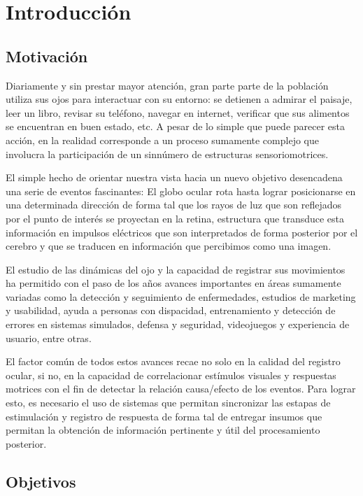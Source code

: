 \documentclass[../main.tex]{subfiles}
\begin{document}
		
\chapter{Introducción}
\label{cha:01_introducción}
	\section{Motivación}
	\label{sec:01_motivacion}

		Diariamente y sin prestar mayor atención, gran parte parte de la población utiliza sus ojos para interactuar con su entorno: se detienen a admirar el paisaje, leer un libro, revisar su teléfono, navegar en internet, verificar que sus alimentos se encuentran en buen estado, etc. A pesar de lo simple que puede parecer esta acción, en la realidad corresponde a un proceso sumamente complejo que involucra la participación de un sinnúmero de estructuras sensoriomotrices. 

		El simple hecho de orientar nuestra vista hacia un nuevo objetivo desencadena una serie de eventos fascinantes: El globo ocular rota hasta lograr posicionarse en una determinada dirección de forma tal que los rayos de luz que son reflejados por el punto de interés se proyectan en la \gls{retina}, estructura que transduce esta información en impulsos eléctricos que son interpretados de forma posterior por el cerebro y que se traducen en información que percibimos como una imagen. 

		El estudio de las dinámicas del ojo y la capacidad de registrar sus movimientos ha permitido con el paso de los años avances importantes en áreas sumamente variadas como la detección y seguimiento de enfermedades, estudios de marketing y usabilidad, ayuda a personas con dispacidad, entrenamiento y detección de errores en sistemas simulados, defensa y seguridad, videojuegos y experiencia de usuario, entre otras.

		El factor común de todos estos avances recae no solo en la calidad del registro ocular, si no, en la capacidad de correlacionar estímulos visuales y respuestas motrices con el fin de detectar la relación causa/efecto de los eventos. Para lograr esto, es necesario el uso de sistemas que permitan sincronizar las estapas de estimulación y registro de respuesta de forma tal de entregar insumos que permitan la obtención de información pertinente y útil del procesamiento posterior.  

	\section{Objetivos}
	\label{sec:01_objetivos}
\end{document}
